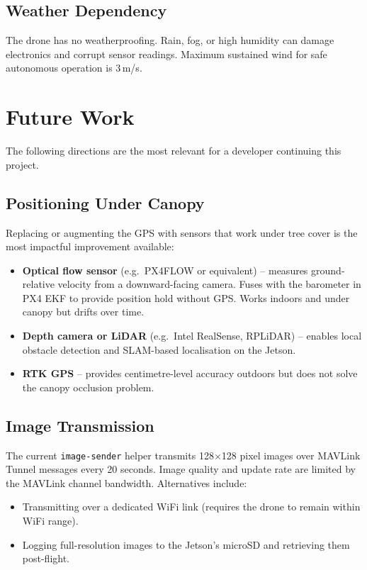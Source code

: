 \documentclass{article}
\begin{document}
\subsection{Weather Dependency}

The drone has no weatherproofing. Rain, fog, or high humidity can damage electronics and corrupt sensor readings. Maximum sustained wind for safe autonomous operation is 3\,m/s.

\section{Future Work}
\label{sec:futurework}

The following directions are the most relevant for a developer continuing this project.

\subsection{Positioning Under Canopy}

Replacing or augmenting the GPS with sensors that work under tree cover is the most impactful improvement available:

\begin{itemize}
    \item \textbf{Optical flow sensor} (e.g.\ PX4FLOW or equivalent) -- measures ground-relative velocity from a downward-facing camera. Fuses with the barometer in PX4 EKF to provide position hold without GPS. Works indoors and under canopy but drifts over time.
    \item \textbf{Depth camera or LiDAR} (e.g.\ Intel RealSense, RPLiDAR) -- enables local obstacle detection and SLAM-based localisation on the Jetson.
    \item \textbf{RTK GPS} -- provides centimetre-level accuracy outdoors but does not solve the canopy occlusion problem.
\end{itemize}

\subsection{Image Transmission}

The current \texttt{image-sender} helper transmits 128$\times$128 pixel images over MAVLink Tunnel messages every 20 seconds. Image quality and update rate are limited by the MAVLink channel bandwidth. Alternatives include:
\begin{itemize}
    \item Transmitting over a dedicated WiFi link (requires the drone to remain within WiFi range).
    \item Logging full-resolution images to the Jetson's microSD and retrieving them post-flight.
\end{itemize}
\end{document}
